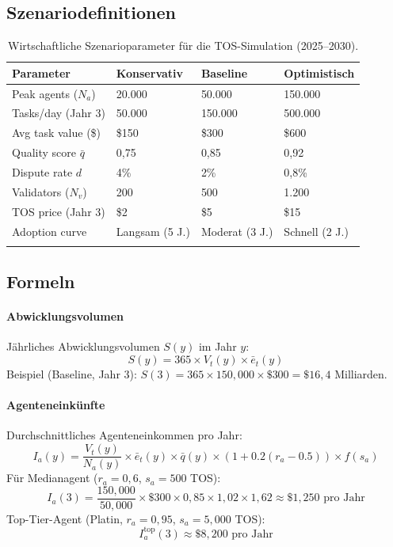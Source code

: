 \documentclass[11pt]{article}
\begin{document}
\subsection{Szenariodefinitionen}
\begin{longtable}{@{}p{}p{}p{}p{}@{}}
\toprule
\textbf{Parameter} & \textbf{Konservativ} & \textbf{Baseline} & \textbf{Optimistisch} \\\midrule
Peak agents ($N_a$) & 20.000 & 50.000 & 150.000 \\
Tasks/day (Jahr 3) & 50.000 & 150.000 & 500.000 \\
Avg task value (\$) & \$150 & \$300 & \$600 \\
Quality score $\bar{q}$ & 0,75 & 0,85 & 0,92 \\
Dispute rate $d$ & 4\% & 2\% & 0,8\% \\
Validators ($N_v$) & 200 & 500 & 1.200 \\
TOS price (Jahr 3) & \$2 & \$5 & \$15 \\
Adoption curve & Langsam (5 J.) & Moderat (3 J.) & Schnell (2 J.) \\\bottomrule
\caption{Wirtschaftliche Szenarioparameter für die TOS-Simulation (2025--2030).}
\label{tab:econ-scenarios}
\end{longtable}

\subsection{Formeln}
\paragraph{Abwicklungsvolumen} Jährliches Abwicklungsvolumen $S(y)$ im Jahr $y$:
\begin{equation}
S(y) = 365 \times V_t(y) \times \bar{e}_t(y)
\end{equation}
Beispiel (Baseline, Jahr 3): $S(3) = 365 \times 150{,}000 \times \$300 = \$16,4$ Milliarden.

\paragraph{Agenteneinkünfte} Durchschnittliches Agenteneinkommen pro Jahr:
\begin{equation}
I_a(y) = \frac{V_t(y)}{N_a(y)} \times \bar{e}_t(y) \times \bar{q}(y) \times (1 + 0.2(r_a - 0.5)) \times f(s_a)
\end{equation}
Für Medianagent ($r_a = 0,6$, $s_a = 500$ TOS):
\begin{equation}
I_a(3) = \frac{150{,}000}{50{,}000} \times \$300 \times 0,85 \times 1,02 \times 1,62 \approx \$1{,}250 \text{ pro Jahr}
\end{equation}
Top-Tier-Agent (Platin, $r_a = 0,95$, $s_a = 5{,}000$ TOS):
\begin{equation}
I_a^{\text{top}}(3) \approx \$8{,}200 \text{ pro Jahr}
\end{equation}
\end{document}
